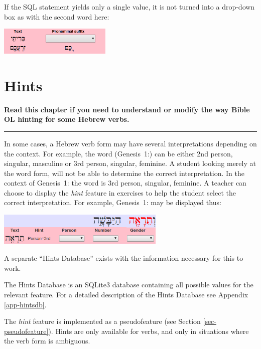 \documentclass[11pt,oneside,a4paper]{memoir}
\newcommand*{\bibleref}[3]{#1~#2\thinspace:\thinspace#3}
\newcommand{\heb}[1]{{\RL {\ezr #1}}}
\begin{document}
If the SQL statement yields only a single value, it is not turned into a drop-down box as with the second
word here:

\begin{center}
  \includegraphics[width=0.4\textwidth]{pronsuf2.png}
\end{center}

\chapter{Hints}\label{chap-hints}

\textbf{Read this chapter if you need to understand or modify the way Bible OL hinting for some
  Hebrew verbs.}
\plainbreak{3}


In some cases, a Hebrew verb form may have several interpretations depending on the context. For
example, the word \heb{תֵרָאֶה} (\bibleref{Genesis}{1}{9}) can be either 2nd person, singular,
masculine or 3rd person, singular, feminine. A student looking merely at the word form, will not be
able to determine the correct interpretation. In the context of \bibleref{Genesis}{1}{9} the word is
3rd person, singular, feminine. A teacher can choose to display the \emph{hint} feature in exercises
to help the student select the correct interpretation. For example, \bibleref{Genesis}{1}{9} may be
displayed thus:

\begin{center}
  \includegraphics[width=0.6\textwidth]{hint.png}
\end{center}

A separate ``Hints Database'' exists with the information necessary
for this to work.

The Hints Database is an SQLite3 database containing all possible values for the
relevant feature. For a detailed description of the Hints Database see Appendix \ref{app-hintsdb}.

The \emph{hint} feature is implemented as a pseudofeature (see Section \ref{sec-pseudofeature}).
Hints are only available for verbs, and only in situations where the verb form is ambiguous.
\end{document}
